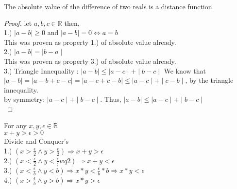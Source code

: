\documentclass[12pt]{article}
\theoremstyle{definition}
\newenvironment{statement}[2][Section]{\begin{trivlist}
\item[\hskip \labelsep {\bfseries #1}\hskip \labelsep {\bfseries #2.}]}{\end{trivlist}}
\begin{document}
\begin{theorem}
The absolute value of the difference of two reals is a distance function.\\
\begin{proof}
  let $a,b,c \in \mathbb{R} $ then,\\
  1.) $\mid a - b \mid \ge 0$ and $\mid a - b \mid = 0 \iff a = b$\\
  This was proven as property 1.) of absolute value already.\\
  2.) $\mid a - b \mid = \mid b - a \mid$\\
  This was proven as property 3.) of absolute value already.\\
  3.) Triangle Innequality : $\mid a - b \mid \le \mid a- c \mid + \mid b - c \mid $
  We know that $\mid a - b \mid = \mid a - b + c - c \mid = \mid a -c + c - b \mid \le \mid a - c \mid + \mid c - b \mid $, by the triangle innequality.\\
  by symmetry: $\mid a - c \mid + \mid b - c \mid$. Thus, $\mid a - b \mid \le \mid a - c \mid + \mid b - c\mid $\\
\end{proof}
\end{theorem}
\begin{statement}{Ideas!}
  For any $x,y,\epsilon \in \mathbb{R}$\\
   $ x + y > \epsilon > 0 $\\
   Divide and Conquer's \\

  1.) $(x > \frac{\epsilon}{2} \land y > \frac{\epsilon}{2}) \Rightarrow x + y > \epsilon $\\
  2.) $(x < \frac{\epsilon}{2} \land y < \frac{\epsilon}:wq
  {2}) \Rightarrow x + y < \epsilon$\\
  3.) $(x < \frac{\epsilon}{b} \land y < b) \Rightarrow x * y < \frac{\epsilon}{b} * b \Rightarrow x * y < \epsilon $\\
  4.) $(x > \frac{\epsilon}{b} \land y > b ) \Rightarrow x * y > \epsilon $
\end{statement}




 
\end{document}
